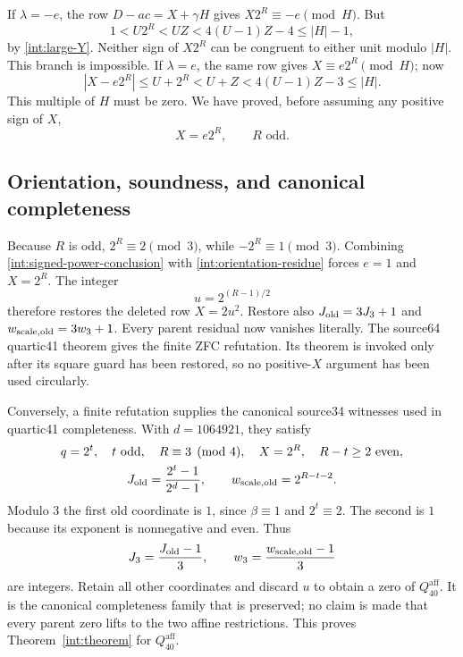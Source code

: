 If $\lambda=-e$, the row $D-ac=X+\gamma H$ gives
$X2^R\equiv-e\pmod H$.  But
\[
 1<U2^R<UZ<4(U-1)Z-4\leq|H|-1,
\]
by \eqref{int:large-Y}.  Neither sign of $X2^R$ can be congruent to
either unit modulo $|H|$.  This branch is impossible.
If $\lambda=e$, the same row gives $X\equiv e2^R\pmod H$; now
\[
 |X-e2^R|\leq U+2^R<U+Z<4(U-1)Z-3\leq|H|.
\]
This multiple of $H$ must be zero.  We have proved, before assuming
any positive sign of $X$,
\begin{equation}\label{int:signed-power-conclusion}
                      X=e2^R,\qquad R\text{ odd}.
\end{equation}

\subsection{Orientation, soundness, and canonical completeness}
\label{int:finish}

Because $R$ is odd, $2^R\equiv2\pmod3$, while
$-2^R\equiv1\pmod3$.  Combining
\eqref{int:signed-power-conclusion} with
\eqref{int:orientation-residue} forces $e=1$ and $X=2^R$.
The integer
\[
                         u=2^{(R-1)/2}
\]
therefore restores the deleted row $X=2u^2$.
Restore also $J_{\rm old}=3J_3+1$ and
$w_{{\rm scale},\rm old}=3w_3+1$.
Every parent residual now vanishes literally.  The source64 quartic41
theorem gives the finite ZFC refutation.  Its theorem is invoked only
after its square guard has been restored, so no positive-$X$ argument
has been used circularly.

Conversely, a finite refutation supplies the canonical source34 witnesses
used in quartic41 completeness.  With $d=1064921$, they satisfy
\[
 \begin{gathered}
 q=2^t,\quad t\text{ odd},\quad R\equiv3\pmod4,\quad
 X=2^R,\quad R-t\geq2\text{ even},\\
 J_{\rm old}=\frac{2^t-1}{2^d-1},\qquad
 w_{{\rm scale},\rm old}=2^{R-t-2}.
 \end{gathered}
\]
Modulo $3$ the first old coordinate is $1$, since $\beta\equiv1$
and $2^t\equiv2$.  The second is $1$ because its exponent is
nonnegative and even.  Thus
\[
 J_3=\frac{J_{\rm old}-1}{3},\qquad
 w_3=\frac{w_{{\rm scale},\rm old}-1}{3}
\]
are integers.  Retain all other coordinates and discard $u$ to obtain a
zero of $Q_{40}^{\mathrm{aff}}$.  It is the canonical completeness family that is
preserved; no claim is made that every parent zero lifts to the two
affine restrictions.  This proves Theorem~\ref{int:theorem} for $Q_{40}^{\mathrm{aff}}$.

